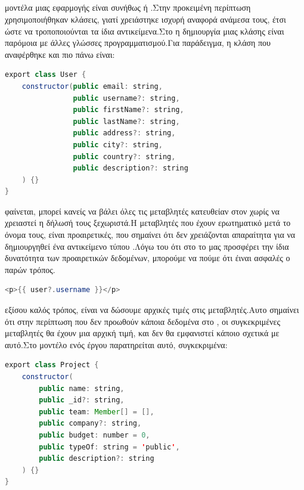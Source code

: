 \subsection*{}
 μοντέλα μιας εφαρμογής είναι συνήθως  ή .Στην προκειμένη περίπτωση χρησιμοποιήθηκαν κλάσεις, γιατί χρειάστηκε ισχυρή αναφορά ανάμεσα τους, έτσι ώστε να τροποποιούνται τα ίδια αντικείμενα.Στο  η δημιουργία μιας κλάσης είναι παρόμοια με άλλες γλώσσες προγραμματισμού.Για παράδειγμα, η κλάση  που αναφέρθηκε και πιο πάνω είναι:\\
	\begin{lstlisting}[language=Java]
export class User {
    constructor(public email: string,
                public username?: string,
                public firstName?: string,
                public lastName?: string,
                public address?: string,
                public city?: string,
                public country?: string,
                public description?: string
    ) {}
}
	\end{lstlisting}
 φαίνεται, μπορεί κανείς να βάλει όλες τις μεταβλητές κατευθείαν στον  χωρίς να χρειαστεί η δήλωσή τους ξεχωριστά.Η μεταβλητές που έχουν ερωτηματικό μετά το όνομα τους, είναι προαιρετικές, που σημαίνει ότι δεν χρειάζονται απαραίτητα για να δημιουργηθεί ένα αντικείμενο τύπου .Λόγω του ότι στο  το  μας προσφέρει την ίδια δυνατότητα των προαιρετικών δεδομένων, μπορούμε να πούμε ότι έιναι ασφαλές ο παρών τρόπος.\\

	\begin{lstlisting}[language=Java]
<p>{{ user?.username }}</p>
	\end{lstlisting}

 εξίσου καλός τρόπος, είναι να δώσουμε αρχικές τιμές στις μεταβλητές.Αυτο σημαίνει ότι στην περίπτωση που δεν προωθούν κάποια δεδομένα στο , οι συγκεκριμένες μεταβλητές θα έχουν μια αρχική τιμή, και δεν θα εμφανιστεί κάποιο  σχετικά με αυτό.Στο μοντέλο ενός έργου παρατηρείται αυτό, συγκεκριμένα:\\

	\begin{lstlisting}[language=Java]
export class Project {
    constructor(
        public name: string,
        public _id?: string,
        public team: Member[] = [],
        public company?: string,
        public budget: number = 0,
        public typeOf: string = 'public',
        public description?: string
    ) {}
}
	\end{lstlisting}

